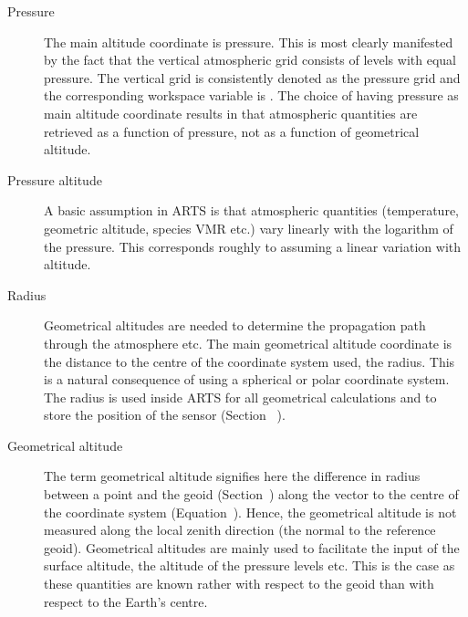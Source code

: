 \begin{description}
  
\item[Pressure] The main altitude coordinate is
  pressure. This is most clearly manifested by the fact that the
  vertical atmospheric grid consists of levels with equal pressure.
  The vertical grid is consistently denoted as the pressure grid and
  the corresponding workspace variable is . The
  choice of having pressure as main altitude coordinate results in
  that atmospheric quantities are retrieved as a function of pressure,
  not as a function of geometrical altitude.
  
\item[Pressure altitude] A basic assumption
  in ARTS is that atmospheric quantities (temperature, geometric
  altitude, species VMR etc.) vary linearly with the logarithm of the
  pressure. This corresponds roughly to assuming a linear variation
  with altitude. 
  
\item[Radius] Geometrical altitudes are
  needed to determine the propagation path through the atmosphere etc.
  The main geometrical altitude coordinate is the distance to the
  centre of the coordinate system used, the radius. This is a natural
  consequence of using a spherical or polar coordinate system. The
  radius is used inside ARTS for all geometrical calculations and to
  store the position of the sensor (Section~
  ).
  
\item[Geometrical altitude] The term
  geometrical altitude signifies here the difference in radius between
  a point and the geoid (Section~) along the
  vector to the centre of the coordinate system
  (Equation~). Hence, the geometrical altitude
  is not measured along the local zenith direction (the normal to the
  reference geoid). Geometrical altitudes are mainly used to
  facilitate the input of the surface altitude, the altitude of the
  pressure levels etc. This is the case as these quantities are known
  rather with respect to the geoid than with respect to the Earth's
  centre.

\end{description}
